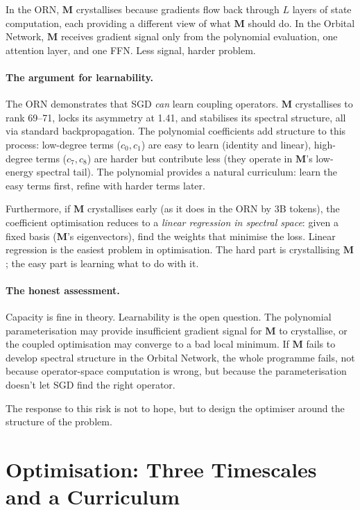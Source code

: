 \documentclass[11pt, a4paper]{article}
\newcommand{\M}{\mathbf{M}}
\theoremstyle{plain}
\theoremstyle{definition}
\theoremstyle{remark}
\begin{document}
In the ORN, $\M$ crystallises because gradients flow back through $L$ layers of state computation, each providing a different view of what $\M$ should do.
In the Orbital Network, $\M$ receives gradient signal only from the polynomial evaluation, one attention layer, and one FFN.
Less signal, harder problem.

\paragraph{The argument for learnability.}
The ORN demonstrates that SGD \emph{can} learn coupling operators.
$\M$ crystallises to rank 69--71, locks its asymmetry at 1.41, and stabilises its spectral structure, all via standard backpropagation.
The polynomial coefficients add structure to this process: low-degree terms ($c_0, c_1$) are easy to learn (identity and linear), high-degree terms ($c_7, c_8$) are harder but contribute less (they operate in $\M$'s low-energy spectral tail).
The polynomial provides a natural curriculum: learn the easy terms first, refine with harder terms later.

Furthermore, if $\M$ crystallises early (as it does in the ORN by 3B tokens), the coefficient optimisation reduces to a \emph{linear regression in spectral space}: given a fixed basis ($\M$'s eigenvectors), find the weights that minimise the loss.
Linear regression is the easiest problem in optimisation.
The hard part is crystallising $\M$; the easy part is learning what to do with it.

\paragraph{The honest assessment.}
Capacity is fine in theory.
Learnability is the open question.
The polynomial parameterisation may provide insufficient gradient signal for $\M$ to crystallise, or the coupled optimisation may converge to a bad local minimum.
If $\M$ fails to develop spectral structure in the Orbital Network, the whole programme fails, not because operator-space computation is wrong, but because the parameterisation doesn't let SGD find the right operator.

The response to this risk is not to hope, but to design the optimiser around the structure of the problem.


\section{Optimisation: Three Timescales and a Curriculum}
\label{sec:optimisation}
\end{document}
